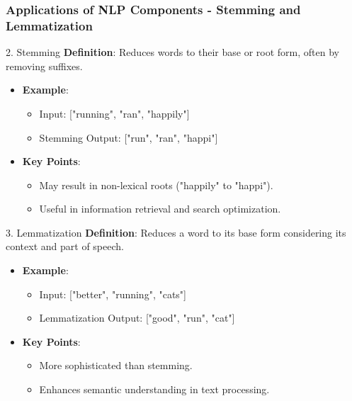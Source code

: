 \documentclass[aspectratio=169]{beamer}
\begin{document}
\begin{frame}[fragile]
    \frametitle{Applications of NLP Components - Stemming and Lemmatization}
    \begin{block}{2. Stemming}
        \textbf{Definition}: Reduces words to their base or root form, often by removing suffixes.
    \end{block}
    \begin{itemize}
        \item \textbf{Example}: 
            \begin{itemize}
                \item Input: ["running", "ran", "happily"]
                \item Stemming Output: ["run", "ran", "happi"]
            \end{itemize}
        \item \textbf{Key Points}: 
            \begin{itemize}
                \item May result in non-lexical roots ("happily" to "happi").
                \item Useful in information retrieval and search optimization.
            \end{itemize}
    \end{itemize}

    \begin{block}{3. Lemmatization}
        \textbf{Definition}: Reduces a word to its base form considering its context and part of speech.
    \end{block}
    \begin{itemize}
        \item \textbf{Example}: 
            \begin{itemize}
                \item Input: ["better", "running", "cats"]
                \item Lemmatization Output: ["good", "run", "cat"]
            \end{itemize}
        \item \textbf{Key Points}: 
            \begin{itemize}
                \item More sophisticated than stemming.
                \item Enhances semantic understanding in text processing.
            \end{itemize}
    \end{itemize}
\end{frame}
\end{document}

